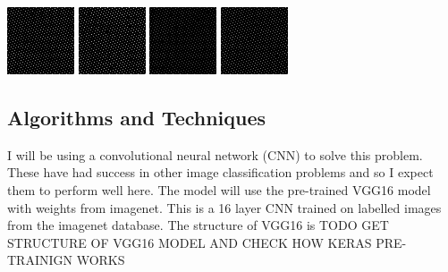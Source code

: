 \documentclass{article}
\begin{document}
\includegraphics[scale=1]{my_iceberg_band_1}
\includegraphics[scale=1]{my_iceberg_band_2}
\includegraphics[scale=1]{my_not_iceberg_band_1}
\includegraphics[scale=1]{my_not_iceberg_band_2}


 
\subsection{Algorithms and Techniques}
I will be using a convolutional neural network (CNN) to solve this problem. These have had success in other image classification problems and so I expect them to perform well here. The model will use the pre-trained VGG16 model with weights from imagenet. This is a 16 layer CNN trained on labelled images from the imagenet database. The structure of VGG16 is
TODO GET STRUCTURE OF VGG16 MODEL AND CHECK HOW KERAS PRE-TRAINIGN WORKS
\end{document}
